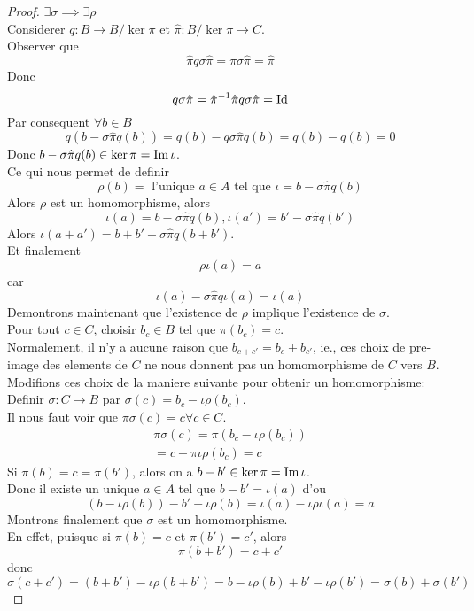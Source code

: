 \documentclass[../main.tex]{subfiles}
\begin{document}
\begin{proof}
$\exists \sigma\implies \exists\rho$\\
Considerer $q: B \to B / \ker\pi$ et $ \hat{\pi}: B /\ker\pi\to C$.\\
Observer que 
\[ 
\hat{\pi}q\sigma \hat{\pi}= \pi \sigma \hat{\pi}= \hat{\pi}
\]
Donc 
\[ 
q\sigma \hat{\pi}= \hat{\pi}^{-1}\hat{\pi}q\sigma \hat{\pi}= \operatorname{Id}
\]
Par consequent $\forall b \in B$ 
\[ 
q( b-\sigma \hat{\pi}q( b) ) = q( b) - q\sigma \hat{\pi}q( b) = q( b) - q( b) =0
\]
Donc $ b - \sigma \hat{\pi}q( b) \in \ker\pi= \operatorname{Im} \iota$.\\
Ce qui nous permet de definir
\[ 
\rho( b) = \text{ l'unique  } a\in A \text{ tel que  } \iota= b- \sigma \hat{\pi}q( b) 
\]
Alors $\rho$ est un homomorphisme, alors
\[ 
\iota( a) = b - \sigma \hat{\pi}q( b) , \iota( a') = b' - \sigma \hat{\pi}q( b') 
\]
Alors $\iota( a+a') = b+b' - \sigma \hat{\pi}q( b+b') $.\\
Et finalement 
\[ 
\rho \iota( a) = a
\]
car 
\[ 
\iota( a) - \sigma \hat{\pi}q \iota( a) = \iota( a) 
\]
Demontrons maintenant que l'existence de $\rho$ implique l'existence de $\sigma$.\\
Pour tout $c\in C$, choisir $ b_c\in B$ tel que $\pi( b_c) =c$.\\
Normalement, il n'y a aucune raison que $b_{c+c'} = b_c + b_{c'} $, ie., ces choix de pre-image des elements de $C$ ne nous donnent pas un homomorphisme de $C$ vers $B$.\\
Modifions ces choix de la maniere suivante pour obtenir un homomorphisme:\\
Definir $\sigma: C\to B$ par $\sigma( c) = b_c - \iota\rho( b_c) $.\\
Il nous faut voir que $\pi\sigma( c) =c\forall c \in C$.\\
\begin{align*}
\pi\sigma( c) = \pi( b_c- \iota \rho( b_c) ) \\
= c - \pi \iota\rho( b_c) = c
\end{align*}
Si $\pi( b) = c = \pi( b') $, alors on a $b-b'\in \ker\pi = \operatorname{Im}\iota$.\\
Donc il existe un unique $a\in A$ tel que $b-b' = \iota( a) $ d'ou
\[ 
	( b-\iota\rho( b) ) - b'- \iota\rho( b) = \iota( a) -\iota\rho\iota(a) = a
\]
Montrons finalement que $\sigma$ est un homomorphisme.\\
En effet, puisque si $\pi( b) = c$ et $\pi( b') = c'$, alors 
\[ 
\pi( b+b') =c+c'
\]
donc 
\[ 
\sigma( c+c') = ( b+b') - \iota\rho( b+b') = b - \iota\rho( b) + b' - \iota\rho( b') = \sigma( b) + \sigma( b') 
\]

		



\end{proof}
			
\end{document}
